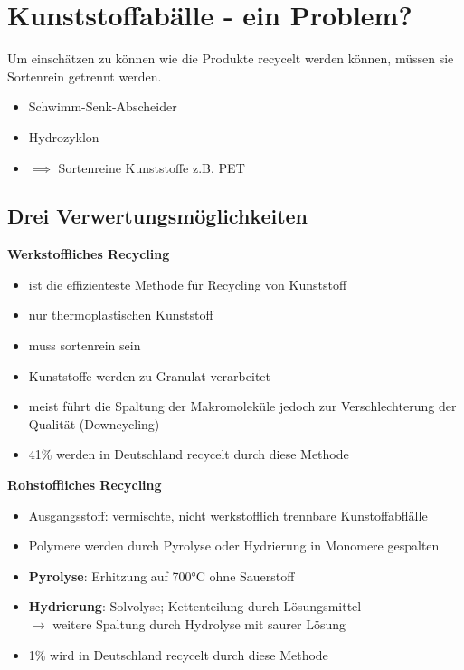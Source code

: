 
\section{Kunststoffabälle - ein Problem?}
Um einschätzen zu können wie die Produkte recycelt werden können,
müssen sie Sortenrein getrennt werden.
\begin{itemize}
    \item Schwimm-Senk-Abscheider
    \item Hydrozyklon
    \item $\implies$ Sortenreine Kunststoffe z.B. PET
\end{itemize}

\subsection{Drei Verwertungsmöglichkeiten}

\textbf{Werkstoffliches Recycling} 
\begin{itemize}
    \item ist die effizienteste Methode für Recycling von Kunststoff
    \item nur thermoplastischen Kunststoff
    \item muss sortenrein sein
    \item Kunststoffe werden zu Granulat verarbeitet
    \item meist führt die Spaltung der Makromoleküle jedoch zur Verschlechterung der Qualität (Downcycling)
    \item 41\% werden in Deutschland recycelt durch diese Methode
\end{itemize}

\vspace{0.5cm}

\textbf{Rohstoffliches Recycling} 

\begin{itemize}
    \item Ausgangsstoff: vermischte, nicht werkstofflich trennbare Kunstoffabflälle
    \item Polymere werden durch Pyrolyse oder Hydrierung in Monomere gespalten
    \item \textbf{Pyrolyse}: Erhitzung auf 700°C ohne Sauerstoff
    \item \textbf{Hydrierung}: Solvolyse; Kettenteilung durch Lösungsmittel \\
        $\rightarrow$ weitere Spaltung durch Hydrolyse mit saurer Lösung
    \item 1\% wird in Deutschland recycelt durch diese Methode
\end{itemize}


